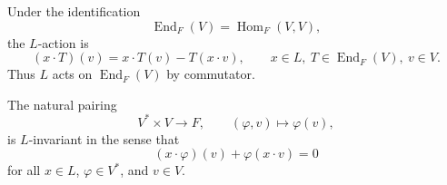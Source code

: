 \begin{remark}
    Under the identification
    \[
        \operatorname{End}_F(V)=\operatorname{Hom}_F(V,V),
    \]
    the \(L\)-action is
    \[
        (x\cdot T)(v)=x\cdot T(v)-T(x\cdot v),
        \qquad x\in L,\ T\in \operatorname{End}_F(V),\ v\in V.
    \]
    Thus \(L\) acts on \(\operatorname{End}_F(V)\) by commutator.
\end{remark}

\begin{remark}
    The natural pairing
    \[
        V^*\times V \to F,\qquad (\varphi,v)\mapsto \varphi(v),
    \]
    is \(L\)-invariant in the sense that
    \[
        (x\cdot \varphi)(v)+\varphi(x\cdot v)=0
    \]
    for all \(x\in L\), \(\varphi\in V^*\), and \(v\in V\).
\end{remark}

